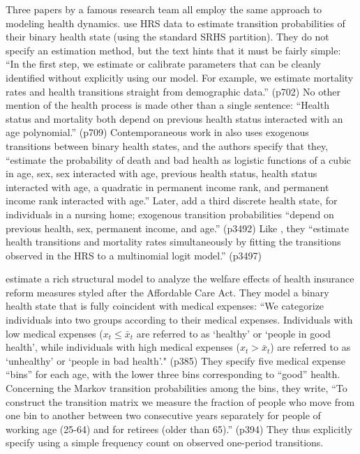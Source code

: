 \documentclass[12pt,pdftex,letterpaper]{article}
\begin{document}
Three papers by a famous research team all employ the same approach to modeling health dynamics.  \cite{French11} use HRS data to estimate transition probabilities of their binary health state (using the standard SRHS partition).  They do not specify an estimation method, but the text hints that it must be fairly simple: ``In the first step, we estimate or calibrate parameters that can be cleanly identified without explicitly using our model.  For example, we estimate mortality rates and health transitions straight from demographic data.'' (p702)  No other mention of the health process is made other than a single sentence: ``Health status and mortality both depend on previous health status interacted with an age polynomial.'' (p709)  Contemporaneous work in \cite{DeNardi10} also uses exogenous transitions between binary health states, and the authors specify that they, ``estimate the probability of death and bad health as logistic functions of a cubic in age, sex, sex interacted with age, previous health status, health status interacted with age, a quadratic in permanent income rank, and permanent income rank interacted with age.''  Later, \cite{DeNardi16} add a third discrete health state, for individuals in a nursing home; exogenous transition probabilities ``depend on previous health, sex, permanent income, and age.'' (p3492)  Like \cite{Khwaja10}, they ``estimate health transitions and mortality rates simultaneously by fitting the transitions observed in the HRS to a multinomial logit model.'' (p3497)

\cite{Pashchenko13} estimate a rich structural model to analyze the welfare effects of health insurance reform measures styled after the Affordable Care Act.  They model a binary health state that is fully coincident with medical expenses: ``We categorize individuals into two groups according to their medical expenses.  Individuals with low medical expenses ($x_t \leq \bar{x}_t$ are referred to as `healthy' or `people in good health', while individuals with high medical expenses ($x_t > \bar{x}_t$) are referred to as `unhealthy' or `people in bad health'." (p385)  They specify five medical expense ``bins'' for each age, with the lower three bins corresponding to ``good'' health.  Concerning the Markov transition probabilities among the bins, they write, ``To construct the transition matrix we measure the fraction of people who move from one bin to another between two consecutive years separately for people of working age (25-64) and for retirees (older than 65).'' (p394) They thus explicitly specify using a simple frequency count on observed one-period transitions.
\end{document}
